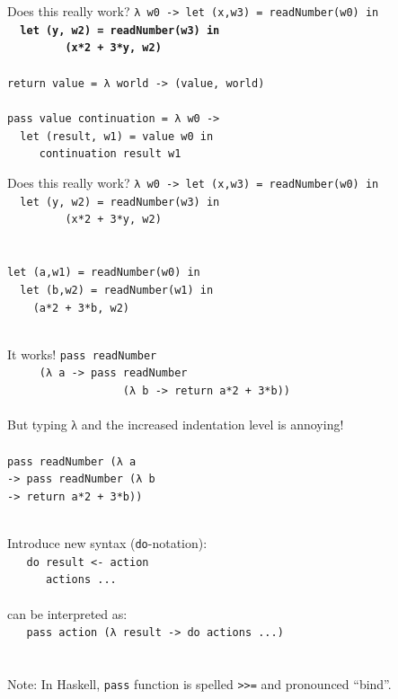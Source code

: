 \documentclass{beamer}
\begin{document}
\begin{frame}{Does this really work?}
  \texttt{λ w0 -> let (x,w3) = readNumber(w0) in\\
    \ \ \textbf{let (y, w2) = readNumber(w3) in\\
      \ \ \ \ \ \ \ \ \ (x*2 + 3*y, w2)}\\
    \ \\
    return value = λ world -> (value, world) \\
    \ \\
    pass value continuation = λ w0 -> \\
    \ \ let (result, w1) = value w0 in \\
    \ \ \ \ \ continuation result w1
  }
\end{frame}

\begin{frame}{Does this really work?}
  \texttt{λ w0 -> let (x,w3) = readNumber(w0) in\\
    \ \ let (y, w2) = readNumber(w3) in\\
      \ \ \ \ \ \ \ \ \ (x*2 + 3*y, w2)\\
    \ \\ \ \\
    let (a,w1) = readNumber(w0) in \\
    \ \ let (b,w2) = readNumber(w1) in \\
    \ \ \ \ (a*2 + 3*b, w2) \\
    \ 
  }
\end{frame}


\begin{frame}{It works!}
  \texttt{pass readNumber \\
    \ \ \ \ \ (λ a -> pass readNumber \\
    \ \ \ \ \ \ \ \ \ \ \ \ \ \ \ \ \ \ (λ b -> return a*2 + 3*b))
  } \\ \ \\ \pause
  But typing λ and the increased indentation level is annoying! \\ \pause
  \ \\
  \texttt{pass readNumber (λ a \\
    -> pass readNumber (λ b \\
    -> return a*2 + 3*b))
  } 
\end{frame}

\begin{frame}
  \ \\ Introduce new syntax (\texttt{do}-notation): \\
  \texttt{
    \ \ do result <- action \\
    \ \ \ \ \ \ actions  ... \\
  } \ \\ \pause
  can be interpreted as: \\ \pause
  \texttt{
    \ \ pass action (λ result -> do actions ...) \\
  } \ \\  \pause
  \ \\
  Note: In Haskell, \texttt{pass} function is spelled
  \texttt{>>=} and pronounced ``bind''.
\end{frame}
\end{document}
